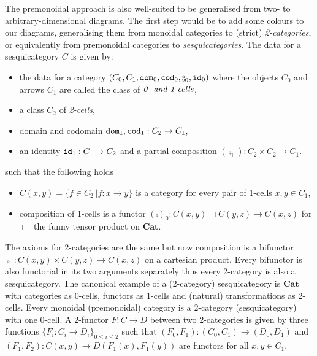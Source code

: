 The premonoidal approach is also well-suited to be generalised from two- to arbitrary-dimensional diagrams.
The first step would be to add some colours to our diagrams, generalising them from monoidal categories to (strict) \emph{2-categories}, or equivalently from premonoidal categories to \emph{sesquicategories}.
The data for a sesquicategory $C$ is given by:
\begin{itemize}
    \item the data for a category $(C_0, C_1, \dom_0, \cod_0, \fcmp_0, \id_0)$ where the objects $C_0$ and arrows $C_1$ are called the class of $\emph{0- and 1-cells}$,
    \item a class $C_2$ of \emph{2-cells},
    \item domain and codomain $\mathtt{dom}_1, \mathtt{cod}_1 : C_2 \to C_1$,
    \item an identity $\mathtt{id}_1 : C_1 \to C_2$ and a partial composition $(\fcmp_1) : C_2 \times C_2 \to C_1$.
\end{itemize}
such that the following holds
\begin{itemize}
    \item $C(x, y) = \{ f \in C_2 \ \vert f : x \to y \}$ is a category for every pair of 1-cells $x, y \in C_1$,
    \item composition of 1-cells is a functor $(\fcmp)_0 : C(x, y) \Box C(y, z) \to C(x, z)$ for $\Box$ the funny tensor product on $\mathbf{Cat}$.
\end{itemize}
The axioms for 2-categories are the same but now composition is a bifunctor $\fcmp_1 : C(x, y) \times C(y, z) \to C(x, z)$ on a cartesian product.
Every bifunctor is also functorial in its two arguments separately thus every 2-category is also a sesquicategory.
The canonical example of a (2-category) sesquicategory is $\mathbf{Cat}$ with categories as 0-cells, functors as 1-cells and (natural) transformations as 2-cells.
Every monoidal (premonoidal) category is a 2-category (sesquicategory) with one 0-cell.
A 2-functor $F : C \to D$ between two 2-categories is given by three functions $\{ F_i : C_i \to D_i \}_{0 \leq i \leq 2}$ such that $(F_0, F_1) : (C_0, C_1) \to (D_0, D_1)$ and $(F_1, F_2) : C(x, y) \to D(F_1(x), F_1(y))$ are functors for all $x, y \in C_1$.

